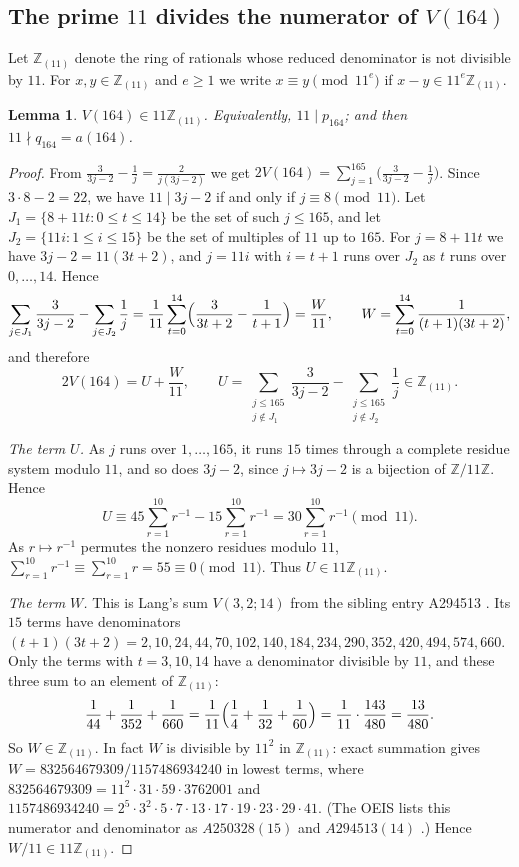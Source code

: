 \documentclass[11pt]{amsart}
\theoremstyle{plain}
\newtheorem{lemma}[theorem]{Lemma}
\theoremstyle{definition}
\newcommand{\Z}{\mathbb{Z}}
\newcommand{\Zl}{\mathbb{Z}_{(11)}}
\begin{document}
\subsection{The prime $11$ divides the numerator of $V(164)$}

Let $\Zl$ denote the ring of rationals whose reduced denominator is not divisible by $11$. For $x,y\in\Zl$ and $e\ge1$ we write $x\equiv y\pmod{11^e}$ if $x-y\in 11^e\Zl$.

\begin{lemma}\label{lem:11adic}
$V(164)\in 11\Zl$. Equivalently, $11\mid p_{164}$; and then $11\nmid q_{164}=a(164)$.
\end{lemma}

\begin{proof}
From $\frac{3}{3j-2}-\frac{1}{j}=\frac{2}{j(3j-2)}$ we get $2V(164)=\sum_{j=1}^{165}\bigl(\frac{3}{3j-2}-\frac1j\bigr)$.
Since $3\cdot 8-2=22$, we have $11\mid 3j-2$ if and only if $j\equiv 8\pmod{11}$. Let $J_1=\{8+11t:0\le t\le 14\}$ be the set of such $j\le165$, and let $J_2=\{11i:1\le i\le15\}$ be the set of multiples of $11$ up to $165$. For $j=8+11t$ we have $3j-2=11(3t+2)$, and $j=11i$ with $i=t+1$ runs over $J_2$ as $t$ runs over $0,\dots,14$. Hence
\[
  \sum_{j\in J_1}\frac{3}{3j-2}-\sum_{j\in J_2}\frac1j=\frac1{11}\sum_{t=0}^{14}\Bigl(\frac{3}{3t+2}-\frac{1}{t+1}\Bigr)=\frac{W}{11},
  \qquad W=\sum_{t=0}^{14}\frac{1}{(t+1)(3t+2)},
\]
and therefore
\[
  2V(164)=U+\frac{W}{11},\qquad U=\sum_{\substack{j\le165\\ j\notin J_1}}\frac{3}{3j-2}-\sum_{\substack{j\le165\\ j\notin J_2}}\frac1j\in\Zl.
\]

\emph{The term $U$.} As $j$ runs over $1,\dots,165$, it runs $15$ times through a complete residue system modulo $11$, and so does $3j-2$, since $j\mapsto 3j-2$ is a bijection of $\Z/11\Z$. Hence
\[
  U\equiv 45\sum_{r=1}^{10}r^{-1}-15\sum_{r=1}^{10}r^{-1}=30\sum_{r=1}^{10}r^{-1}\pmod{11}.
\]
As $r\mapsto r^{-1}$ permutes the nonzero residues modulo $11$, $\sum_{r=1}^{10}r^{-1}\equiv\sum_{r=1}^{10}r=55\equiv0\pmod{11}$. Thus $U\in 11\Zl$.

\emph{The term $W$.} This is Lang's sum $V(3,2;14)$ from the sibling entry A294513 \cite{A294513}. Its $15$ terms have denominators $(t+1)(3t+2)=2,10,24,44,70,102,140,184,234,290,352,420,494,574,660$. Only the terms with $t=3,10,14$ have a denominator divisible by $11$, and these three sum to an element of $\Zl$:
\[
  \frac1{44}+\frac1{352}+\frac1{660}=\frac1{11}\Bigl(\frac14+\frac1{32}+\frac1{60}\Bigr)=\frac{1}{11}\cdot\frac{143}{480}=\frac{13}{480}.
\]
So $W\in\Zl$. In fact $W$ is divisible by $11^2$ in $\Zl$: exact summation gives
$W=832564679309/1157486934240$ in lowest terms, where $832564679309=11^2\cdot31\cdot59\cdot3762001$ and $1157486934240=2^5\cdot3^2\cdot5\cdot7\cdot13\cdot17\cdot19\cdot23\cdot29\cdot41$. (The OEIS lists this numerator and denominator as $A250328(15)$ and $A294513(14)$ \cite{A250328,A294513}.) Hence $W/11\in 11\Zl$.


\end{proof}
\end{document}
